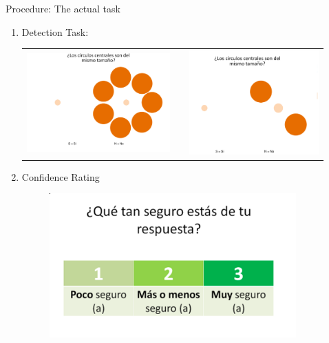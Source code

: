 \documentclass[final]{beamer}
\newlength{\sepwid}
\newlength{\onecolwid}
\newlength{\twocolwid}
\begin{document}
\begin{frame}[t]
\begin{columns}[t]
\begin{column}{\twocolwid}
\begin{columns}[t,totalwidth=\twocolwid]
\begin{column}{\onecolwid}
\begin{alertblock}{Procedure: The actual task}
\begin{enumerate}
\item Detection Task:
\begin{center}
\begin{tabular}{ccc}
\includegraphics[width=0.45\linewidth]{Figures/MainTask.png} & \hfill & \includegraphics[width=0.4\linewidth]{Figures/MainTask2.png}
\end{tabular}
\end{center}
\item Confidence Rating
\begin{figure}
\includegraphics[width=0.5\linewidth]{Figures/ConfidenceTask.png}
\end{figure}
\end{enumerate}
\end{alertblock}
\end{column} %

\begin{column}{\sepwid}\end{column} %
\begin{column}{\twocolwid}\vspace{-2in} %


\end{column}
\end{columns}
\end{column}
\end{columns}
\end{frame}
\end{document}
